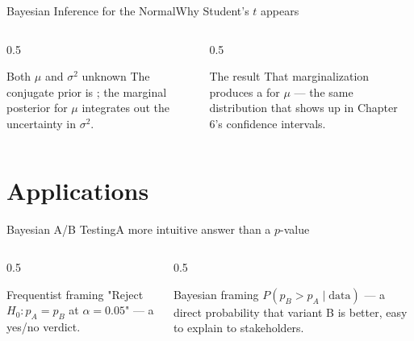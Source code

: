 \documentclass[aspectratio=169,11pt]{beamer}
\begin{document}
\begin{frame}{Bayesian Inference for the Normal}{Why Student's $t$ appears}
  \begin{columns}[T]
    \begin{column}{0.5\textwidth}
      \begin{block}{Both $\mu$ and $\sigma^2$ unknown}
        \small The conjugate prior is ; the marginal
        posterior for $\mu$ integrates out the uncertainty in $\sigma^2$.
      \end{block}
    \end{column}
    \begin{column}{0.5\textwidth}
      \begin{exampleblock}{The result}
        \small That marginalization produces a  for $\mu$ — the same distribution that shows up
        in Chapter 6's confidence intervals.
      \end{exampleblock}
    \end{column}
  \end{columns}
\end{frame}

\section{Applications}

\begin{frame}{Bayesian A/B Testing}{A more intuitive answer than a $p$-value}
  \begin{columns}[T]
    \begin{column}{0.5\textwidth}
      \begin{alertblock}{Frequentist framing}
        \small "Reject $H_0:p_A=p_B$ at $\alpha=0.05$" — a yes/no verdict.
      \end{alertblock}
    \end{column}
    \begin{column}{0.5\textwidth}
      \begin{exampleblock}{Bayesian framing}
        \small $P(p_B > p_A \mid \text{data})$ — a direct probability that
        variant B is better, easy to explain to stakeholders.
      \end{exampleblock}
    \end{column}
  \end{columns}
\end{frame}
\end{document}
